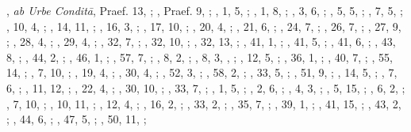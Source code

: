 \begin{autindex}
,
  \subitem \emph{ab Urbe Conditā},
    \subsubitem  Praef. 13, ;
    ,  Praef. 9, ;
    ,  1,  5, ;
    ,  1,  8, ;
    ,  3,  6, ;
    ,  5,  5, ;
    ,  7,  5, ;
    , 10,  4, ;
    , 14, 11, ;
    , 16,  3, ;
    , 17, 10, ;
    , 20,  4, ;
    , 21,  6, ;
    , 24,  7, ;
    , 26,  7, ;
    , 27,  9, ;
    , 28,  4, ;
    , 29,  4, ;
    , 32,  7, ;
    , 32, 10, ;
    , 32, 13, ;
    , 41,  1, ;
    , 41,  5, ;
    , 41,  6, ;
    , 43,  8, ;
    , 44,  2, ;
    , 46,  1, ;
    , 57,  7, ;
    ,  8,  2, ;
    ,  8,  3, , ;
    , 12,  5, ;
    , 36,  1, ;
    , 40,  7, ;
    , 55, 14, ;
    ,  7, 10, ;
    , 19,  4, ;
    , 30,  4, ;
    , 52,  3, ;
    , 58,  2, ;
    , 33,  5, ;
    , 51,  9, ;
    , 14,  5, ;
    ,  7,  6, ;
    , 11, 12, ;
    , 22,  4, ;
    , 30, 10, ;
    , 33,  7, ;
    ,  1,  5, ;
    ,  2,  6, ;
    ,  4,  3, ;
    ,  5, 15, ;
    ,  6,  2, ;
    ,  7, 10, ;
    , 10, 11, ;
    , 12,  4, ;
    , 16,  2, ;
    , 33,  2, ;
    , 35,  7, ;
    , 39,  1, ;
    , 41, 15, ;
    , 43,  2, ;
    , 44,  6, ;
    , 47,  5, ;
    , 50, 11, ;

\end{autindex}
